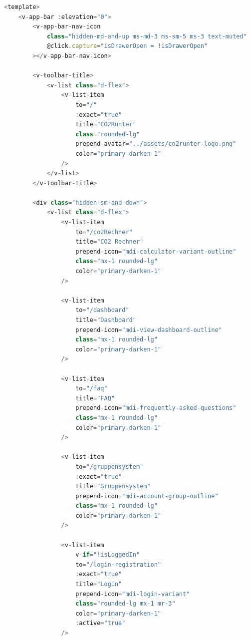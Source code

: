\begin{lstlisting}[language={JavaScript}, caption={Navigationsleiste für Web als auch Mobile}]
<template>
    <v-app-bar :elevation="0">
        <v-app-bar-nav-icon
            class="hidden-md-and-up ms-md-3 ms-sm-5 ms-3 text-muted"
            @click.capture="isDrawerOpen = !isDrawerOpen"
        ></v-app-bar-nav-icon>

        <v-toolbar-title>
            <v-list class="d-flex">
                <v-list-item
                    to="/"
                    :exact="true"
                    title="CO2Runter"
                    class="rounded-lg"
                    prepend-avatar="../assets/co2runter-logo.png"
                    color="primary-darken-1"
                />
            </v-list>
        </v-toolbar-title>

        <div class="hidden-sm-and-down">
            <v-list class="d-flex">
                <v-list-item
                    to="/co2Rechner"
                    title="CO2 Rechner"
                    prepend-icon="mdi-calculator-variant-outline"
                    class="mx-1 rounded-lg"
                    color="primary-darken-1"
                />

                <v-list-item
                    to="/dashboard"
                    title="Dashboard"
                    prepend-icon="mdi-view-dashboard-outline"
                    class="mx-1 rounded-lg"
                    color="primary-darken-1"
                />

                <v-list-item
                    to="/faq"
                    title="FAQ"
                    prepend-icon="mdi-frequently-asked-questions"
                    class="mx-1 rounded-lg"
                    color="primary-darken-1"
                />

                <v-list-item
                    to="/gruppensystem"
                    :exact="true"
                    title="Gruppensystem"
                    prepend-icon="mdi-account-group-outline"
                    class="mx-1 rounded-lg"
                    color="primary-darken-1"
                />

                <v-list-item
                    v-if="!isLoggedIn"
                    to="/login-registration"
                    :exact="true"
                    title="Login"
                    prepend-icon="mdi-login-variant"
                    class="rounded-lg mx-1 mr-3"
                    color="primary-darken-1"
                    :active="true"
                />


\end{lstlisting}
